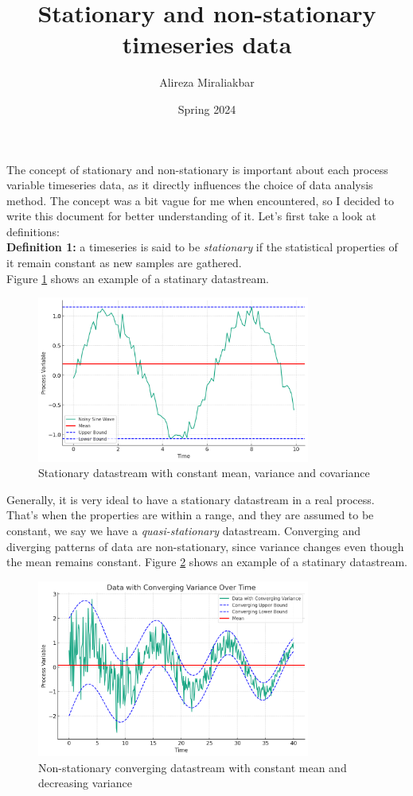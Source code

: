 \documentclass{article}
\title{Stationary and non-stationary timeseries data}
\author{Alireza Miraliakbar}
\affil{School of Chemical Engineering, Oklahoma State University, Stillwater, OK, 74078}
\date{Spring 2024}
\begin{document}
\maketitle
The concept of stationary and non-stationary is important about each process variable 
timeseries data, as it directly influences the choice of data analysis method. The concept 
was a bit vague for me when encountered, so I decided to write this document for better understanding
of it. 
Let's first take a look at definitions:
\newline 
\\
\textbf{Definition 1:} a timeseries is said to be \textit{stationary} if the statistical 
properties of it remain constant as new samples are gathered.
\\

Figure \ref{fig:sine-wave} shows an example of a statinary datastream. 
\begin{figure}[h]
    \center 
    \includegraphics[width=0.8\textwidth]{stationary-wave.png}
    \caption{Stationary datastream with constant mean, variance and covariance}
    \label{fig:sine-wave}
\end{figure}

Generally, it is very ideal to have a stationary datastream in a real process. That's when the properties are
within a range, and they are assumed to be constant, we say we have a \textit{quasi-stationary} datastream.
Converging and diverging patterns of data are non-stationary, since variance changes even though the mean remains
constant.
Figure \ref{fig:converge-wave} shows an example of a statinary datastream. 
\begin{figure}[h]
    \center 
    \includegraphics[width=0.8\textwidth]{convering data.png}
    \caption{Non-stationary converging datastream with constant mean and decreasing variance}
    \label{fig:converge-wave}
\end{figure}
\end{document}
